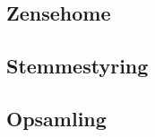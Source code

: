 \label{sec:teknologianalyse}

\subsection{Zensehome}
\label{sec:tekzensehome}

\subsection{Stemmestyring}

\subsection{Opsamling}
